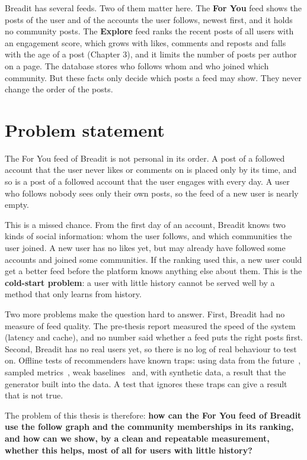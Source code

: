 Breadit has several feeds. Two of them matter here. The \textbf{For You} feed shows the posts of the user and of the accounts the user follows, newest first, and it holds no community posts. The \textbf{Explore} feed ranks the recent posts of all users with an engagement score, which grows with likes, comments and reposts and falls with the age of a post (Chapter 3), and it limits the number of posts per author on a page. The database stores who follows whom and who joined which community. But these facts only decide which posts a feed may show. They never change the order of the posts.

\section{Problem statement}
\label{sec:intro-problem}

The For You feed of Breadit is not personal in its order. A post of a followed account that the user never likes or comments on is placed only by its time, and so is a post of a followed account that the user engages with every day. A user who follows nobody sees only their own posts, so the feed of a new user is nearly empty.

This is a missed chance. From the first day of an account, Breadit knows two kinds of social information: whom the user follows, and which communities the user joined. A new user has no likes yet, but may already have followed some accounts and joined some communities. If the ranking used this, a new user could get a better feed before the platform knows anything else about them. This is the \textbf{cold-start problem}: a user with little history cannot be served well by a method that only learns from history.

Two more problems make the question hard to answer. First, Breadit had no measure of feed quality. The pre-thesis report measured the speed of the system (latency and cache), and no number said whether a feed puts the right posts first. Second, Breadit has no real users yet, so there is no log of real behaviour to test on. Offline tests of recommenders have known traps: using data from the future~, sampled metrics~, weak baselines~ and, with synthetic data, a result that the generator built into the data. A test that ignores these traps can give a result that is not true.

The problem of this thesis is therefore: \textbf{how can the For You feed of Breadit use the follow graph and the community memberships in its ranking, and how can we show, by a clean and repeatable measurement, whether this helps, most of all for users with little history?}

